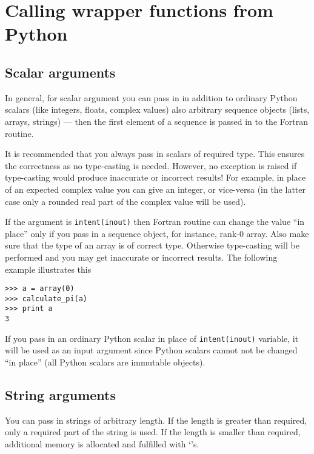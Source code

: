 
\section{Calling wrapper functions from Python}
\label{sec:notes}

\subsection{Scalar arguments}
\label{sec:scalars}

In general, for scalar argument you can pass in in
addition to ordinary Python scalars (like integers, floats, complex
values) also arbitrary sequence objects (lists, arrays, strings) ---
then the first element of a sequence is passed in to the Fortran routine.

It is recommended that you always pass in scalars of required type. This
ensures the correctness as no type-casting is needed.
However, no exception is raised if type-casting would produce
inaccurate or incorrect results! For example, in place of an expected
complex value you can give an integer, or vice-versa (in the latter case only
a rounded real part of the complex value will be used).

If the argument is \texttt{intent(inout)} then Fortran routine can change the
value ``in place'' only if you pass in a sequence object, for
instance, rank-0 array. Also make sure that the type of an array is of
correct type. Otherwise type-casting will be performed and you may
get inaccurate or incorrect results. The following example illustrates this
\begin{verbatim}
>>> a = array(0)
>>> calculate_pi(a)
>>> print a
3
\end{verbatim}

If you pass in an ordinary Python scalar in place of
\texttt{intent(inout)} variable, it will be used as an input argument 
since
Python
scalars cannot not be changed ``in place'' (all Python scalars
are immutable objects).

\subsection{String arguments}
\label{sec:strings}

You can pass in strings of arbitrary length. If the length is greater than
required, only a required part of the string is used. If the length
is smaller than required, additional memory is allocated and fulfilled
with `\texttt{}'s.

